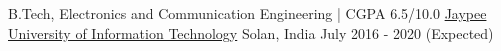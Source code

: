 \begin{cventries}
  \cventry
    {B.Tech, Electronics and Communication Engineering | CGPA 6.5/10.0}
    {\href{http://juit.ac.in}{Jaypee University of Information Technology}}
    {Solan, India}
    {July 2016 - 2020 (Expected)}
    {
      \begin{cvitems}
      \end{cvitems}
    }
\end{cventries}
